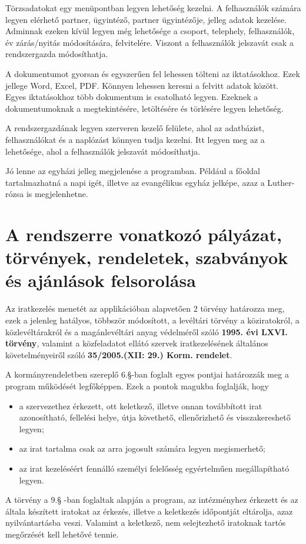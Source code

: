 \documentclass[
]{thesis-ekf}
\theoremstyle{definition}
\theoremstyle{remark}
\begin{document}
Törzsadatokat egy menüpontban legyen lehetőség kezelni. A felhasználók számára legyen elérhető partner, ügyintéző, partner ügyintézője, jelleg adatok kezelése. Adminnak ezeken kívül legyen még lehetősége a csoport, telephely, felhasználók, év zárás/nyitás módosítására, felvitelére.  Viszont a felhasználók jelszavát csak a rendszergazda módosíthatja.

A dokumentumot gyorsan és egyszerűen fel lehessen tölteni az iktatásokhoz. Ezek jellege Word, Excel, PDF. Könnyen lehessen keresni a felvitt adatok között. Egyes iktatásokhoz több dokumentum is csatolható legyen. Ezeknek a dokumentumoknak a megtekintésére, letöltésére és törlésére legyen lehetőség. 

A rendszergazdának legyen szerveren kezelő felülete, ahol az adatbázist, felhasználókat és a naplózást könnyen tudja kezelni. Itt legyen meg az a lehetősége, ahol a felhasználók jelszavát módosíthatja.

Jó lenne az egyházi jelleg megjelenése a programban. Például a főoldal tartalmazhatná a napi igét, illetve az evangélikus egyház jelképe, azaz a Luther-rózsa is megjelenhetne.
\section{A rendszerre vonatkozó pályázat, törvények, rendeletek, szabványok és ajánlások felsorolása}
Az iratkezelés menetét az applikációban alapvetően 2 törvény határozza meg, ezek a jelenleg hatályos, többször módosított, a levéltári törvény a köziratokról, a közlevéltárakról és a magánlevéltári anyag védelméről szóló \textbf{1995. évi LXVI. törvény}, valamint a közfeladatot ellátó szervek iratkezelésének általános követelményeiről szóló \textbf{35/2005.(XII: 29.) Korm. rendelet}. 

A kormányrendeletben szereplő 6.§-ban foglalt egyes pontjai határozzák meg a program működését legfőképpen. Ezek a pontok magukba foglalják, hogy 
\begin{itemize}
	\item a szervezethez érkezett, ott keletkező, illetve onnan továbbított irat azonosítható, fellelési helye, útja követhető, ellenőrizhető és visszakereshető legyen;
	\item az irat tartalma csak az arra jogosult számára legyen megismerhető;
	\item az irat kezeléséért fennálló személyi felelősség egyértelműen megállapítható legyen.
\end{itemize}

A törvény a 9.§ -ban foglaltak alapján a program, az intézményhez érkezett és az általa készített iratokat az érkezés, illetve a keletkezés időpontját eltárolja, azaz nyilvántartásba veszi. Valamint a keletkező, nem selejtezhető iratoknak tartós megőrzését kell lehetővé tennie.
\end{document}
